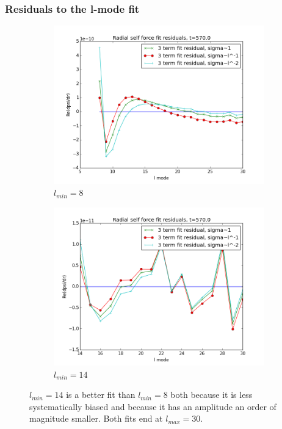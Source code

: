 \documentclass{beamer}
\begin{document}
  
\begin{frame}
  \frametitle{Residuals to the l-mode fit}
  \begin{figure}
    \centering
    \begin{subfigure}{.45\textwidth}
      \centering
      \includegraphics[width=\textwidth]{fitresiduals3terms570l8}
      \caption{$l_{min}=8$}
    \end{subfigure}
    \begin{subfigure}{.45\textwidth}
      \centering
      \includegraphics[width=\textwidth]{fitresidulas3terms570l14}
      \caption{$l_{min}=14$}
    \end{subfigure}
  \caption{$l_{min}=14$ is a better fit than $l_{min}=8$ both because it is less systematically biased and because it has an amplitude an order of magnitude smaller. Both fits end at $l_{max}=30$.}
  \end{figure}
\end{frame}
\end{document}
